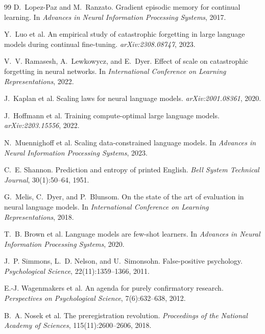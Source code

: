 \documentclass[11pt,a4paper]{article}
\begin{document}
\begin{thebibliography}{99}
D.~Lopez-Paz and M.~Ranzato.
\newblock Gradient episodic memory for continual learning.
\newblock In \emph{Advances in Neural Information Processing Systems}, 2017.

Y.~Luo et al.
\newblock An empirical study of catastrophic forgetting in large language models during continual fine-tuning.
\newblock \emph{arXiv:2308.08747}, 2023.

V.~V. Ramasesh, A.~Lewkowycz, and E.~Dyer.
\newblock Effect of scale on catastrophic forgetting in neural networks.
\newblock In \emph{International Conference on Learning Representations}, 2022.

J.~Kaplan et al.
\newblock Scaling laws for neural language models.
\newblock \emph{arXiv:2001.08361}, 2020.

J.~Hoffmann et al.
\newblock Training compute-optimal large language models.
\newblock \emph{arXiv:2203.15556}, 2022.

N.~Muennighoff et al.
\newblock Scaling data-constrained language models.
\newblock In \emph{Advances in Neural Information Processing Systems}, 2023.

C.~E. Shannon.
\newblock Prediction and entropy of printed English.
\newblock \emph{Bell System Technical Journal}, 30(1):50--64, 1951.

G.~Melis, C.~Dyer, and P.~Blunsom.
\newblock On the state of the art of evaluation in neural language models.
\newblock In \emph{International Conference on Learning Representations}, 2018.

T.~B. Brown et al.
\newblock Language models are few-shot learners.
\newblock In \emph{Advances in Neural Information Processing Systems}, 2020.

J.~P. Simmons, L.~D. Nelson, and U.~Simonsohn.
\newblock False-positive psychology.
\newblock \emph{Psychological Science}, 22(11):1359--1366, 2011.

E.-J. Wagenmakers et al.
\newblock An agenda for purely confirmatory research.
\newblock \emph{Perspectives on Psychological Science}, 7(6):632--638, 2012.

B.~A. Nosek et al.
\newblock The preregistration revolution.
\newblock \emph{Proceedings of the National Academy of Sciences}, 115(11):2600--2606, 2018.

\end{thebibliography}
\end{document}
